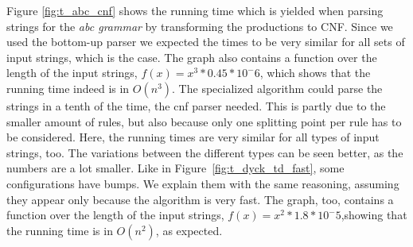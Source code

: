 Figure \ref{fig:t_abc_cnf} shows the running time which is yielded when parsing strings for the \textit{abc grammar} by transforming the productions to CNF.
Since we used the bottom-up parser we expected the times to be very similar for all sets of input strings, which is the case.
The graph also contains a function over the length of the input strings, $f(x)=x^3*0.45*10^-6$, which shows that the running time indeed is in $O(n^3)$.
The specialized algorithm could parse the strings in a tenth of the time, the cnf parser needed.
This is partly due to the smaller amount of rules, but also because only one splitting point per rule has to be considered.
Here, the running times are very similar for all types of input strings, too.
The variations between the different types can be seen better, as the numbers are a lot smaller.
Like in Figure~\ref{fig:t_dyck_td_fast}, some configurations have bumps.
We explain them with the same reasoning, assuming they appear only because the algorithm is very fast.
The graph, too, contains a function over the length of the input strings, $f(x)=x^2*1.8*10^-5$,showing that the running time is in $O(n^2)$, as expected.

